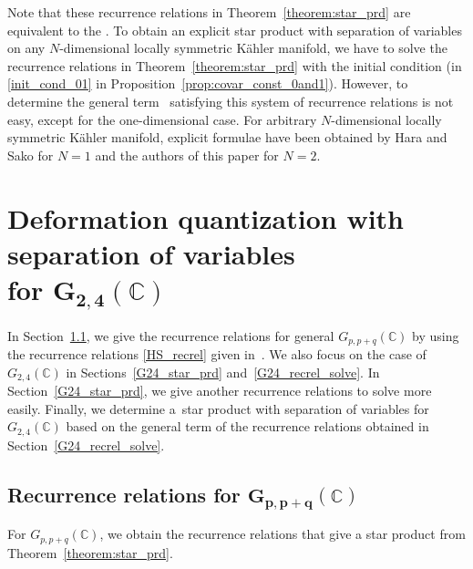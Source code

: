 \documentclass[pdftex]{sigma}
\numberwithin{equation}{section}
\begin{document}
Note that these recurrence relations in Theorem~\ref{theorem:star_prd} are equivalent to the \cite[equations~(6.9)]{SSU1}. To obtain an explicit star product with separation of variables on any $N$-dimensional locally symmetric K\"ahler manifold, we have to solve the recurrence relations in Theorem~\ref{theorem:star_prd} with the initial condition
(in \eqref{init_cond_01} in Proposition~\ref{prop:covar_const_0and1}). However, to determine the general term~
satisfying this system of recurrence relations is not easy, except for the one-dimensional case.
For %
arbitrary $N$-dimensional locally symmetric K\"ahler manifold, explicit formulae have been obtained by Hara and Sako \cite{HS1,HS2} for $N=1$ and the authors of this paper \cite{OS_Varna,OS_jrnl} for $N=2$.

\section[Deformation quantization with separation of variables for G\_\{2,4\}(C)]{Deformation quantization with separation of variables \\ for $\boldsymbol{G_{2,4}(\mathbb{C})}$}
\label{G24_DQ_sep_var}

In Section~\ref{Gpq_recrel_general}, we give the recurrence relations for general
$ G_{p,p+q}(\mathbb{C})$ by using the recurrence relations \eqref{HS_recrel} given in~\cite{HS1,HS2}. We also focus on the case of $G_{2,4}(\mathbb{C})$ in Sections~\ref{G24_star_prd} and~\ref{G24_recrel_solve}. In Section~\ref{G24_star_prd}, we give another recurrence relations to solve more easily. Finally, we determine a~star product with separation of variables for $G_{2,4}(\mathbb{C})$ based on the general term of the recurrence relations obtained in Section~\ref{G24_recrel_solve}.

\subsection[Recurrence relations for G\_\{p,p+q\}(C)]{Recurrence relations for $\boldsymbol{G_{p,p+q}(\mathbb{C})}$}
\label{Gpq_recrel_general}

For $ G_{p,p+q}(\mathbb{C})$,
we obtain the recurrence relations that give a star product from Theorem~\ref{theorem:star_prd}.
\end{document}
